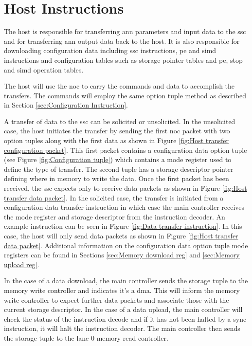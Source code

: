 \section{Host Instructions}
\label{sec:Host Instructions}

The host is responsible for transferring \ac{ann} parameters and input data to the \ac{ssc} and for transferring \ac{ann} output data back to the host.
It is also responsible for downloading configuration data including \ac{ssc} instructions, \ac{pe} and \ac{simd} instructions and configuration tables such as storage pointer tables and \ac{pe}, \ac{stop} and \ac{simd} operation tables.

The host will use the \ac{noc} to carry the commands and data to accomplish the transfers.
The commands will employ the same option tuple method as described in Section \ref{sec:Configuration Instruction}.

A transfer of data to the \ac{ssc} can be solicited or unsolicited.
In the unsolicited case, the host initiates the transfer by sending the first \ac{noc} packet with two option tuples along with the first data as shown in Figure \ref{fig:Host transfer configuration packet}.
This first packet contains a configuration data option tuple (see Figure \ref{fig:Configuration tuple}) which contains a mode register used to define the type of transfer.
The second tuple has a storage descriptor pointer defining where in memory to write the data.
Once the first packet has been received, the \ac{ssc} expects only to receive data packets as shown in Figure \ref{fig:Host transfer data packet}.
In the solicited case, the transfer is initiated from a configuration data transfer instruction in which case the main controller receives the mode register and storage descriptor from the instruction decoder.
An example instruction can be seen in Figure \ref{fig:Data transfer instruction}.
In this case, the host will only send data packets as shown in Figure \ref{fig:Host transfer data packet}.
Additional information on the configuration data option tuple mode registers can be found in Sections \ref{sec:Memory download reg} and \ref{sec:Memory upload reg}.

In the case of a data download, the main controller sends the storage tuple to the memory write controller and indicates it's a \ac{dma}.
This will inform the memory write controller to expect further data packets and associate those with the current storage descriptor.
In the case of a data upload, the main controller will check the status of the instruction decode and if it has not been halted by a sync instruction, it will halt the instruction decoder.
The main controller then sends the storage tuple to the lane 0 memory read controller.

